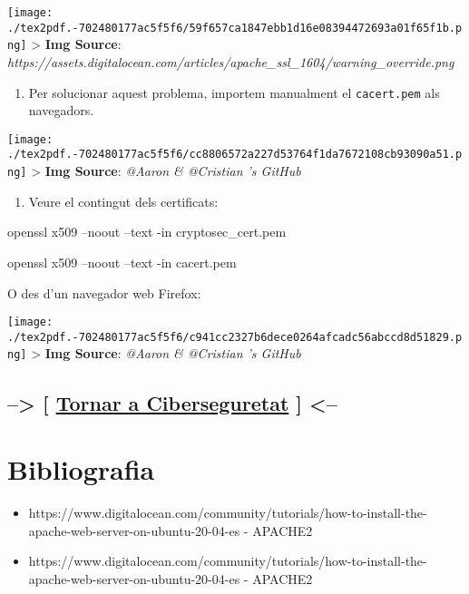 \documentclass[]{article}
\newenvironment{Shaded}{}{}
\newcommand{\ExtensionTok}[1]{#1}
\newcommand{\NormalTok}[1]{#1}
\providecommand{\tightlist}{%
  \setlength{\itemsep}{0pt}\setlength{\parskip}{0pt}}
\begin{document}
\texttt{[image: ./tex2pdf.-702480177ac5f5f6/59f657ca1847ebb1d16e08394472693a01f65f1b.png]}
\textgreater{} \textbf{Img Source}:
\emph{https://assets.digitalocean.com/articles/apache\_ssl\_1604/warning\_override.png}

\begin{enumerate}
\def\labelenumi{\arabic{enumi}.}
\setcounter{enumi}{4}
\tightlist
\item
  Per solucionar aquest problema, importem manualment el
  \texttt{cacert.pem} als navegadors.
\end{enumerate}

\texttt{[image: ./tex2pdf.-702480177ac5f5f6/cc8806572a227d53764f1da7672108cb93090a51.png]}
\textgreater{} \textbf{Img Source}: \emph{@Aaron \& @Cristian 's GitHub}

\begin{enumerate}
\def\labelenumi{\arabic{enumi}.}
\setcounter{enumi}{5}
\tightlist
\item
  Veure el contingut dels certificats:
\end{enumerate}

\begin{Shaded}
\begin{Highlighting}[]
\ExtensionTok{openssl}\NormalTok{ x509 --noout --text -in cryptosec_cert.pem }
\end{Highlighting}
\end{Shaded}

\begin{Shaded}
\begin{Highlighting}[]
\ExtensionTok{openssl}\NormalTok{ x509 --noout --text -in cacert.pem }
\end{Highlighting}
\end{Shaded}

O des d'un navegador web Firefox:

\texttt{[image: ./tex2pdf.-702480177ac5f5f6/c941cc2327b6dece0264afcadc56abccd8d51829.png]}
\textgreater{} \textbf{Img Source}: \emph{@Aaron \& @Cristian 's GitHub}

\hypertarget{tornar-a-ciberseguretat}{%
\subsection{\texorpdfstring{--\textgreater{} {[}
\href{https://github.com/KeshiKiD03/asixproject2k22/blob/main/README.md}{Tornar
a Ciberseguretat} {]}
\textless{}--}{--\textgreater{} {[} Tornar a Ciberseguretat {]} \textless{}--}}\label{tornar-a-ciberseguretat}}

\hypertarget{bibliografia}{%
\section{\texorpdfstring{\textbf{Bibliografia}}{Bibliografia}}\label{bibliografia}}

\begin{itemize}
\tightlist
\item
  https://www.digitalocean.com/community/tutorials/how-to-install-the-apache-web-server-on-ubuntu-20-04-es
  - APACHE2
\item
  https://www.digitalocean.com/community/tutorials/how-to-install-the-apache-web-server-on-ubuntu-20-04-es
  - APACHE2
\end{itemize}
\end{document}

